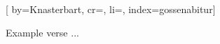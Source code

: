 
[%
    by={Knasterbart},
    cr={},
    li={},
    index={gossenabitur}]


    \label{gossenabitur}

    \beginverse
        Example verse ...
    \endverse
\endsong
